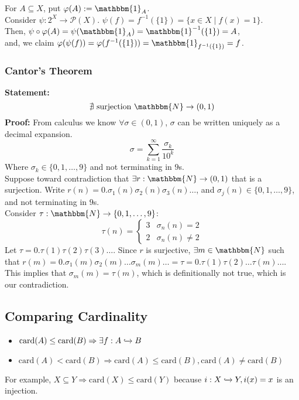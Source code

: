 \documentclass[10pt]{extarticle}
\begin{document}
      For $A\subseteq X$, put $\varphi(A) := \mathbbm{1}_A$.\\

      Consider $\psi: 2^X \rightarrow \mathcal{P}(X)$. $\psi(f) = f^{-1}(\{1\}) = \{x\in X \mid f(x) = 1\}$.\\

      Then, $\psi\circ\varphi(A) = \psi(\mathbbm{1}_A) = \mathbbm{1}^{-1}(\{1\}) = A$,\\

      and, we claim $\varphi(\psi(f)) = \varphi(f^{-1}(\{1\})) = \mathbbm{1}_{f^{-1}(\{1\})} = f$.\\
    \subsubsection{Cantor's Theorem}%
    \textbf{Statement:}\[
        \nexists~\text{surjection}~\mathbbm{N}\rightarrow (0,1)
      \] 
      \textbf{Proof:} From calculus we know $\forall \sigma\in (0,1)$, $\sigma$ can be written uniquely as a decimal expansion.
      \[
        \sigma = \sum_{k=1}^{\infty} \frac{\sigma_k}{10^k}
      \] 
      Where $\sigma_k\in \{0,1,\dots,9\}$ and not terminating in $9$s.\\

      Suppose toward contradiction that $\exists r:\mathbbm{N} \rightarrow (0,1)$ that is a surjection. Write $r(n) = 0.\sigma_1(n)\sigma_2(n)\sigma_3(n)\dots$, and $\sigma_j(n) \in \{0,1,\dots,9\}$, and not terminating in $9$s.\\

      Consider $\tau: \mathbbm{N} \rightarrow \{0,1,\dots,9\}$:
      \[
        \tau(n) = \begin{cases}
          3 & \sigma_n(n) = 2\\
          2 & \sigma_n(n) \neq 2
        \end{cases}
      \]
      Let $\tau = 0.\tau(1)\tau(2)\tau(3)\dots$. Since $r$ is surjective, $\exists m\in \mathbbm{N}$ such that $r(m) = 0.\sigma_1(m)\sigma_2(m)\dots \sigma_m(m)\dots = \tau = 0.\tau(1)\tau(2)\dots\tau(m)\dots$.\\

      This implies that $\sigma_m(m) = \tau(m)$, which is definitionally not true, which is our contradiction.\\
    \subsection{Comparing Cardinality}%
    \begin{itemize}
      \item $\text{card}(A) \leq \text{card}(B) \Rightarrow \exists f: A\xhookrightarrow{} B$ 
      \item $\text{card}(A) < \text{card}(B) \Rightarrow \text{card}(A) \leq \text{card}(B), \text{card}(A) \neq \text{card}(B)$
    \end{itemize}
    For example, $X\subseteq Y \Rightarrow \text{card}(X) \leq \text{card}(Y)$ because $i: X\xhookrightarrow{} Y, i(x) = x$ is an injection.\\
\end{document}
